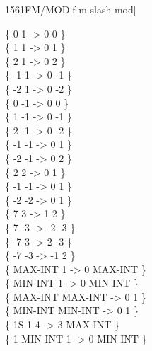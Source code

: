 \begin{worddef}{1561}{FM/MOD}[f-m-slash-mod]
\begin{defer}
	\testing
		\{       0              1  ->  0       0 \} \\
		\{       1              1  ->  0       1 \} \\
		\{       2              1  ->  0       2 \} \\
		\{      -1              1  ->  0      -1 \} \\
		\{      -2              1  ->  0      -2 \} \\
		\{       0             -1  ->  0       0 \} \\
		\{       1             -1  ->  0      -1 \} \\
		\{       2             -1  ->  0      -2 \} \\
		\{      -1             -1  ->  0       1 \} \\
		\{      -2             -1  ->  0       2 \} \\
		\{       2              2  ->  0       1 \} \\
		\{      -1             -1  ->  0       1 \} \\
		\{      -2             -2  ->  0       1 \} \\
		\{       7              3  ->  1       2 \} \\
		\{       7             -3  -> -2      -3 \} \\
		\{      -7              3  ->  2      -3 \} \\
		\{      -7             -3  -> -1       2 \} \\
		\{ MAX-INT              1  ->  0 MAX-INT \} \\
		\{ MIN-INT              1  ->  0 MIN-INT \} \\
		\{ MAX-INT        MAX-INT  ->  0       1 \} \\
		\{ MIN-INT        MIN-INT  ->  0       1 \} \\
		\{    1S 1                         4  ->  3 MAX-INT \} \\
		\{       1 MIN-INT        1  ->  0 MIN-INT \} \\

\end{defer}
\end{worddef}
